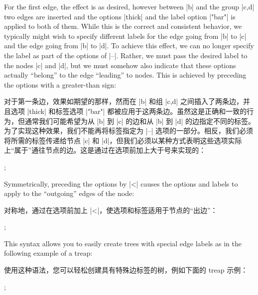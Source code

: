 For the first edge, the effect is as desired, however between |b| and the group
|{c,d}| two edges are inserted and the options |thick| and the label option
|"bar"| is applied to both of them. While this is the correct and consistent
behavior, we typically might wish to specify different labels for the edge
going from |b| to |c| and the edge going from |b| to |d|. To achieve this
effect, we can no longer specify the label as part of the options of |--|.
Rather, we must pass the desired label to the nodes |c| and |d|, but we must
somehow also indicate that these options actually ``belong'' to the edge
``leading'' to nodes. This is achieved by preceding the options with a
greater-than sign:

对于第一条边，效果如期望的那样，然而在 |b| 和组 |{c,d}| 之间插入了两条边，并且选项 |thick| 和标签选项 |"bar"| 都被应用于这两条边。虽然这是正确和一致的行为，但通常我们可能希望为从 |b| 到 |c| 的边和从 |b| 到 |d| 的边指定不同的标签。为了实现这种效果，我们不能再将标签指定为 |--| 选项的一部分。相反，我们必须将所需的标签传递给节点 |c| 和 |d|，但我们必须以某种方式表明这些选项实际上``属于''通往节点的边。这是通过在选项前加上大于号来实现的：

%
\begin{codeexample}[preamble={\usetikzlibrary{graphs,quotes}}]
\tikz {};
\end{codeexample}

Symmetrically, preceding the options by |<| causes the options and labels to
apply to the ``outgoing'' edges of the node:

对称地，通过在选项前加上 |<|，使选项和标签适用于节点的``出边''：

%
\begin{codeexample}[preamble={\usetikzlibrary{graphs,quotes}}]
\tikz {};
\end{codeexample}

This syntax allows you to easily create trees with special edge labels as in
the following example of a treap:

使用这种语法，您可以轻松创建具有特殊边标签的树，例如下面的 treap 示例：

%
\begin{codeexample}[preamble={\usetikzlibrary{graphs,quotes}}]
\tikz
  ;
\end{codeexample}


